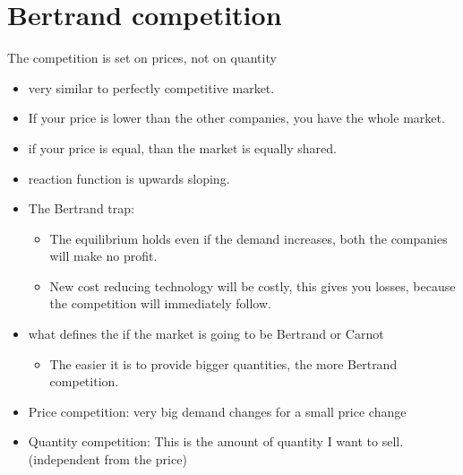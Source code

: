 \documentclass[12pt, a4paper, titlepage]{extarticle}
\begin{document}
\section{Bertrand competition}
The competition is set on prices, not on quantity
\begin{itemize}
    \item very similar to perfectly competitive market.
    \item If your price is lower than the other companies, you have the whole market.
    \item if your price is equal, than the market is equally shared.
    \item reaction function is upwards sloping.
    \item The Bertrand trap:
    \begin{itemize}
        \item The equilibrium holds even if the demand increases, both the companies will make no profit.
        \item New cost reducing technology will be costly, this gives you losses, because the competition will immediately follow.
    \end{itemize}
    \item what defines the if the market is going to be Bertrand or Carnot
    \begin{itemize}
        \item The easier it is to provide bigger quantities, the more Bertrand competition. 
    \end{itemize}
    \item Price competition: very big demand changes for a small price change
    \item Quantity competition: This is the amount of quantity I want to sell. (independent from the price)
\end{itemize}
\end{document}
